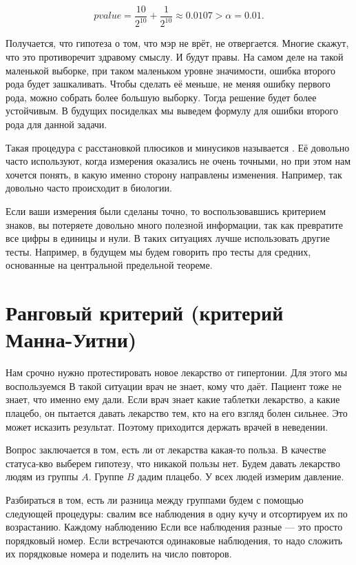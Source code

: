 \documentclass[12pt, a4paper, oneside]{article}
\begin{document}
\[
pvalue = \frac{10}{2^{10}} + \frac{1}{2^{10}} \approx 0.0107 > \alpha = 0.01.
\]

Получается, что гипотеза о том, что мэр не врёт, не отвергается. Многие скажут, что это противоречит здравому смыслу. И будут правы. На самом деле на такой маленькой выборке, при таком маленьком уровне значимости, ошибка второго рода будет зашкаливать. Чтобы сделать её меньше, не меняя ошибку первого рода, можно собрать более большую выборку. Тогда решение будет более устойчивым. В будущих посиделках мы выведем формулу для ошибки второго рода для данной задачи. 

Такая процедура с расстановкой плюсиков и минусиков называется . Её довольно часто используют, когда измерения оказались не очень точными, но при этом нам хочется понять, в какую именно сторону направлены изменения. Например, так довольно часто происходит в биологии. 

Если ваши измерения были сделаны точно, то воспользовавшись критерием знаков, вы потеряете довольно много полезной информации, так как превратите все цифры в единицы и нули. В таких ситуациях лучше использовать другие тесты. Например, в будущем мы будем говорить про тесты для средних, основанные на центральной предельной теореме.  

\section{Ранговый критерий (критерий Манна-Уитни)}

Нам срочно нужно протестировать новое лекарство от гипертонии. Для этого мы воспользуемся  В такой ситуации врач не знает, кому что даёт. Пациент тоже не знает, что именно ему дали. Если врач знает какие таблетки лекарство, а какие плацебо, он пытается давать лекарство тем, кто на его взгляд болен сильнее. Это может исказить результат. Поэтому приходится держать врачей в неведении. 

Вопрос заключается в том, есть ли от лекарства какая-то польза. В качестве статуса-кво выберем гипотезу, что никакой пользы нет. Будем давать лекарство людям из группы $A$. Группе $B$ дадим плацебо. У всех людей измерим давление. 

Разбираться в том, есть ли разница между группами будем с помощью следующей процедуры: свалим все наблюдения в одну кучу и отсортируем их по возрастанию. Каждому наблюдению  Если все наблюдения разные --- это просто порядковый номер. Если встречаются одинаковые наблюдения, то надо сложить их порядковые номера и поделить на число повторов. 
\end{document}
